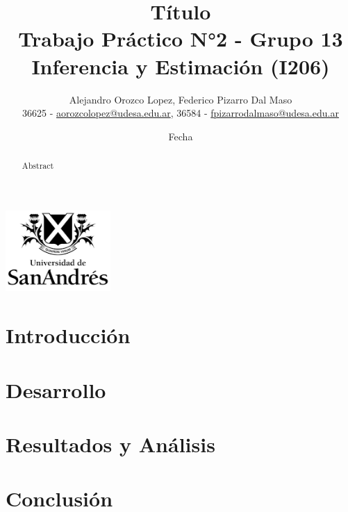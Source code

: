 \documentclass[12pt, a4paper]{article}
\title{Título\\[2ex]\large Trabajo Práctico N°2 - Grupo 13\\[2ex]Inferencia y Estimación (I206)}
\author{Alejandro Orozco Lopez, Federico Pizarro Dal Maso\\[1ex]\small{36625 - \href{mailto:aorozcolopez@udesa.edu.ar}{aorozcolopez@udesa.edu.ar}, 36584 - \href{mailto:fpizarrodalmaso@udesa.edu.ar}{fpizarrodalmaso@udesa.edu.ar}}}
\date{Fecha}
\begin{document}
\captionsetup[subfloat]{captionskip=0pt}

\setlength{\parskip}{1em}

\captionsetup[table]{name=Tabla}

\maketitle

\begin{center}
    {\includegraphics[width=0.3\textwidth]{udesa_logo.png}}
\end{center}

\begin{abstract}
    
Abstract
\end{abstract}

\section*{Introducción}

\section*{Desarrollo}

\section*{Resultados y Análisis}

\section*{Conclusión}
\end{document}
